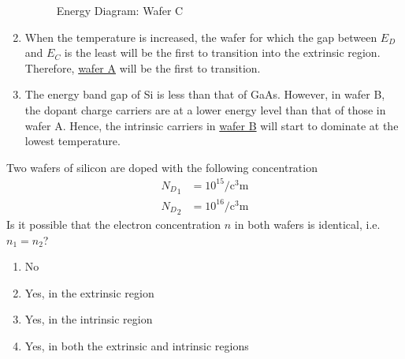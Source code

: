 \documentclass[fleqn, a4paper, 11pt, oneside]{amsart}
\theoremstyle{definition}
\theoremstyle{theorem}
\renewcommand{\emph}{\uline}
\begin{document}
\begin{solution}
\begin{enumerate}[leftmargin=*]
			\begin{figure}[H]
				\centering
				\caption{Energy Diagram: Wafer C}
			\end{figure}
		\item
			When the temperature is increased, the wafer for which the gap between $E_D$ and $E_C$ is the least will be the first to transition into the extrinsic region.
			Therefore, \emph{wafer A} will be the first to transition.
		\item
			The energy band gap of Si is less than that of GaAs.
			However, in wafer B, the dopant charge carriers are at a lower energy level than that of those in wafer A.
			Hence, the intrinsic carriers in \emph{wafer B} will start to dominate at the lowest temperature.
	\end{enumerate}
\end{solution}

\begin{question}
	Two wafers of silicon are doped with the following concentration
	\begin{align*}
		{N_D}_1 &= 10^{15} \si{\per\cubic\centi\metre}\\
		{N_D}_2 &= 10^{16} \si{\per\cubic\centi\metre}
	\end{align*}
	Is it possible that the electron concentration $n$ in both wafers is identical, i.e. $n_1 = n_2$?
	\begin{enumerate}
		\item No
		\item Yes, in the extrinsic region
		\item Yes, in the intrinsic region
		\item Yes, in both the extrinsic and intrinsic regions
	\end{enumerate}
\end{question}
\end{document}
